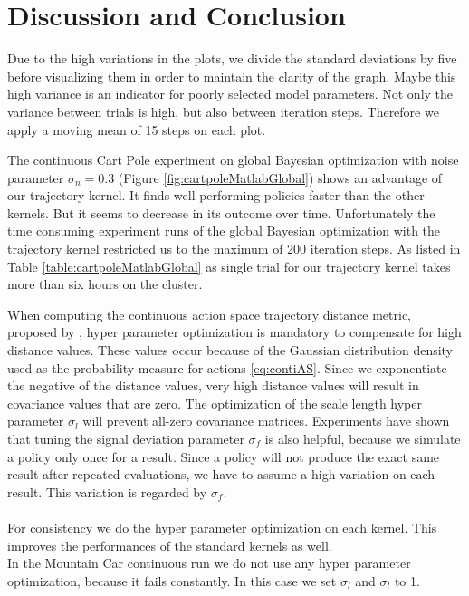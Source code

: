 \chapter{Discussion and Conclusion}
\label{chap:6}

Due to the high variations in the plots, we divide the standard deviations by five before visualizing them in order to maintain the clarity of the graph. Maybe this high variance is an indicator for poorly selected model parameters. Not only the variance between trials is high, but also between iteration steps. Therefore we apply a moving mean of 15 steps on each plot.

The continuous Cart Pole experiment on global Bayesian optimization with noise parameter $\sigma_n = 0.3$ (Figure \ref{fig:cartpoleMatlabGlobal}) shows an advantage of our trajectory kernel. It finds well performing policies faster than the other kernels. But it seems to decrease in its outcome over time. Unfortunately the time consuming experiment runs of the global Bayesian optimization with the trajectory kernel restricted us to the maximum of 200 iteration steps. As listed in Table \ref{table:cartpoleMatlabGlobal} as single trial for our trajectory kernel takes more than six hours on the cluster.



When computing the continuous action space trajectory distance metric, proposed by \cite{wilson2014using}, hyper parameter optimization is mandatory to compensate for high distance values. These values occur because of the Gaussian distribution density used as the probability measure for actions \ref{eq:contiAS}. Since we exponentiate the negative of the distance values, very high distance values will result in covariance values that are zero. The optimization of the scale length hyper parameter $\sigma_l$ will prevent all-zero covariance matrices. Experiments have shown that tuning the signal deviation parameter $\sigma_f$ is also helpful, because we simulate a policy only once for a result. Since a policy will not produce the exact same result after repeated evaluations, we have to assume a high variation on each result. This variation is regarded by $\sigma_f$.\\
\\
For consistency we do the hyper parameter optimization on each kernel. This improves the performances of the standard kernels as well.\\
In the Mountain Car continuous run we do not use any hyper parameter optimization, because it fails constantly. In this case we set $\sigma_l$ and $\sigma_l$ to 1.


